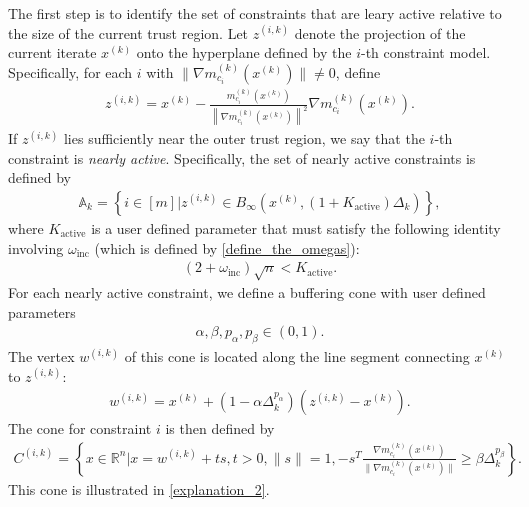 \documentclass{article}
\theoremstyle{case}
\numberwithin{theorem}{subsection}
\newcommand{\activeconstraintsk}{{\mathbb A_{k}}}
\newcommand{\dk}{\Delta_k}
\newcommand{\gmcik}{{\nabla m_{c_i}^{(k)}\left(\xk\right)}}
\newcommand{\hgik}{{\frac{\nabla m^{(k)}_{c_i}(\xk)}{\|\nabla m^{(k)}_{c_i}\left(\xk\right)\|}}}
\newcommand{\omegainc}{\omega_{\text{inc}}}
\newcommand{\Rn}{\mathbb R^n}
\newcommand{\wik}{{w^{(i, k)}}}
\newcommand{\xk}{x^{(k)}}
\newcommand{\zik}{{z^{(i, k)}}}
\newcommand{\fik}{{C^{(i, k)}}}
\newcommand{\zikthresh}{{ K_{\textrm{active}} }}
\begin{document}
The first step is to identify the set of constraints that are leary active relative to the size of the current trust region.
Let $\zik$ denote the projection of the current iterate $\xk$ onto the hyperplane defined by the $i$-th constraint model.
Specifically, for each $i$ with $\|\gmcik\| \ne 0$, define
\begin{align}
\zik = \xk - \frac{m^{(k)}_{c_i}(\xk)}{\left\|\gmcik\right\|^2} \gmcik. \label{define_z}
\end{align}
If $\zik$ lies sufficiently near the outer trust region, we say that the $i$-th constraint is \emph{nearly active}.
Specifically, the set of nearly active constraints is defined by
\begin{align}
\activeconstraintsk = \left\{i \in [m] \bigg| \zik \in B_{\infty}\left(\xk, (1+\zikthresh)\dk\right)\right\}, \label{define_activeconstraints}
\end{align}
where $\zikthresh$ is a user defined parameter that must satisfy the following identity involving $\omegainc$ (which is defined by \cref{define_the_omegas}):
\begin{align}
(2 + \omegainc)\sqrt{n} < \zikthresh. \label{define_zikthresh}
\end{align}
For each nearly active constraint, we define a buffering cone with user defined parameters
\begin{align}
\alpha, \beta, p_{\alpha}, p_{\beta} \in (0, 1). \label{define_abpab}
\end{align}
The vertex $\wik$ of this cone is located along the line segment connecting $\xk$ to $\zik$:
\begin{align}
\wik = \xk + \left(1 - \alpha\dk^{p_{\alpha}}\right)\left(\zik - \xk\right). \label{define_w}
\end{align}
The cone for constraint $i$ is then defined by
\begin{align}
\fik = \left\{x \in \Rn | x = \wik + t s,t > 0, \|s\| = 1, -s^T\hgik \ge \beta \dk^{p_{\beta}} \right\}. \label{define_fik}
\end{align}
This cone is illustrated in \cref{explanation_2}.
\end{document}
